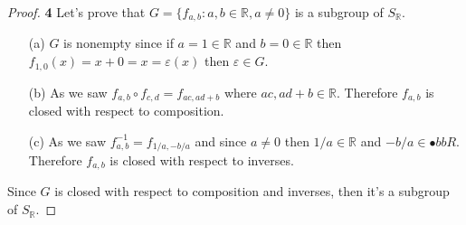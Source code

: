 \documentclass[11pt]{article}
\begin{document}
	\begin{proof}{\textbf{4}} Let's prove that $G = \{f_{a,b}: a,b \in \mathbb{R}, a \neq 0\}$ is a subgroup of $S_{\mathbb{R}}$.
		\begin{itemize}
			\item[(a)] $G$ is nonempty since if $a = 1 \in \mathbb{R}$ and $b=0 \in \mathbb{R}$ then $f_{1,0}(x)=x+0 = x = \varepsilon(x)$ then $\varepsilon \in G$.
			\item[(b)] As we saw $f_{a,b} \circ f_{c,d} = f_{ac,ad+b}$ where $ac,ad+b \in \mathbb{R}$. Therefore $f_{a,b}$ is closed with respect to composition.
			\item[(c)] As we saw $f^{-1}_{a,b} = f_{1/a,-b/a}$ and since $a \neq 0$ then $1/a \in \mathbb{R}$ and $-b/a \in \mathbb{•}bb{R}$. Therefore $f_{a,b}$ is closed with respect to inverses.
		\end{itemize}
		Since $G$ is closed with respect to composition and inverses, then it's a subgroup of $S_{\mathbb{R}}$.
	\end{proof}
\end{document}
